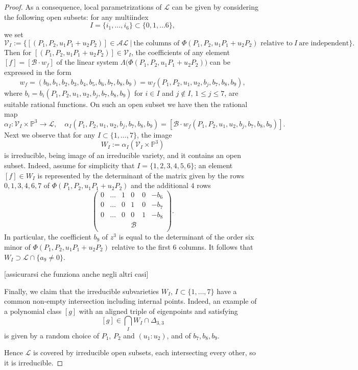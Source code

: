 \documentclass{amsart}
\theoremstyle{plain}
\theoremstyle{definition}
\newcommand{\p}{\mathbb{P}}
\newcommand{\sL}{\mathcal{L}}
\newcommand{\sV}{\mathcal{V}}
\newcommand{\blue}[1]{{\color{blue}  [#1]}}
\begin{document}
\begin{proof}
As a consequence, local parametrizations of $\sL$ can be given by considering the following open subsets:
for any multiindex
$$
I =\{i_1,\dots,i_6\}\subset \{ 0, 1,\dots 6\},
$$
we set
$$
\sV_I := \{ [(P_1, P_2, u_1 P_1 +u_2P_2)] \in \mathcal {AL} \ | \ \text{the\ columns\ of\ } \Phi
(P_1, P_2, u_1 P_1 +u_2P_2) \text{\ relative \ to} \ I\ \text{are\ independent}\}.
$$
Then for $[(P_1, P_2, u_1 P_1 +u_2P_2)]\in \sV_I$, the coefficients of any element
$[f] =[{\mathcal B} \cdot w_f]$ of the linear system
$\Lambda \bigl( \Phi (P_1, P_2, u_1 P_1 +u_2P_2) \bigr)$ can be expressed in the form
\begin{equation}\label{eq: parametrizzazione}
w_f =(b_0,
b_1,
b_2,
b_3,
b_4,
b_5, b_6,b_7,b_8,b_9)=w_f(P_1,P_2,u_1,u_2,b_j,b_7,b_8,b_9),
\end{equation}
where $b_i=b_i (P_1,P_2,u_1,u_2,b_j,b_7,b_8,b_9)$ for $i\in I$ and $j\not \in I$, $1\le j \le 7$, are suitable rational functions. On such an open subset we have then the rational
map
$$
\alpha_I : \sV_I \times \p^3 \to \sL, \quad
\alpha_I (P_1,P_2,u_1,u_2,b_j,b_7,b_8,b_9)=
[{\mathcal B} \cdot w_f(P_1,P_2,u_1,u_2,b_j,b_7,b_8,b_9)].
$$
Next we observe that for any $I \subset \{1,\dots, 7\}$, the image
$$
W_I:=\alpha_I (\sV_I \times \p^3)
$$
is irreducible, being image of an irreducible variety, and it
contains an open subset. Indeed, assume for simplicity that
$I=\{1,2,3,4,5,6\}$; an element $[f]\in W_I$ is represented by the determinant of the
matrix given by the rows $0,1,3,4,6,7$ of $\Phi (P_1, P_2, u_1 P_1 +u_2P_2)$ and the additional $4$ rows
\[
 \left(
 \begin{array}{cccccc}
  0 & \dots & 1&0&0&-b_6 \\
 0 & \dots & 0&1&0&-b_7 \\
 0 & \dots & 0&0&1&-b_8 \\
  & & &\mathcal {B} & & \\
 \end{array}
 \right).
\]
In particular, the coefficient $b_9$ of $z^3$ is equal to the determinant of the order six minor of $\Phi (P_1, P_2, u_1 P_1 +u_2P_2)$ relative to the first $6$ columns. It follows that $W_I \supset \sL \cap \{ a_9 \neq 0\}$.

\blue{assicurarsi che funziona anche negli altri casi}

Finally, we claim that the irreducible subvarieties $W_I$, $I\subset \{1,\dots, 7\}$ have a common non-empty intersection
including internal points. Indeed, an example of a polynomial
class $[g]$ with an aligned triple of eigenpoints and satisfying
$$
[g] \in \bigcap _I W_I \cap \Delta_{3,3}
$$
is given by a random choice of $P_1$, $P_2$ and $(u_1:u_2)$, and of $b_7,b_8,b_9$.


Hence $\sL$ is covered by irreducible open subsets, each intersecting every other, so it is irreducible.
\end{proof}
\end{document}

